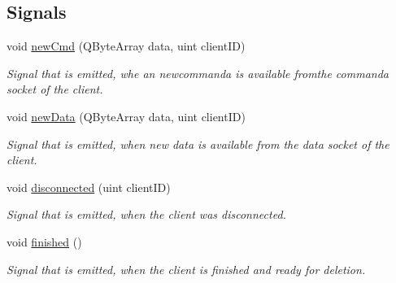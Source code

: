 \subsection*{Signals}
\begin{DoxyCompactItemize}
\item 
void \hyperlink{class_network_1_1_connected_client_a405d291ca221b2390fa58587145b5fb2}{new\+Cmd} (Q\+Byte\+Array data, uint client\+I\+D)
\begin{DoxyCompactList}\small\item\em Signal that is emitted, whe an newcommanda is available fromthe commanda socket of the client. \end{DoxyCompactList}\item 
void \hyperlink{class_network_1_1_connected_client_ad4ed988e03524de43ed3a2ac8df8999c}{new\+Data} (Q\+Byte\+Array data, uint client\+I\+D)
\begin{DoxyCompactList}\small\item\em Signal that is emitted, when new data is available from the data socket of the client. \end{DoxyCompactList}\item 
void \hyperlink{class_network_1_1_connected_client_ae9691e6b687bda4cec080cd26b4fc4a6}{disconnected} (uint client\+I\+D)
\begin{DoxyCompactList}\small\item\em Signal that is emitted, when the client was disconnected. \end{DoxyCompactList}\item 
void \hyperlink{class_network_1_1_connected_client_ad91c79c1c98aaad2b35e554f6030cd0b}{finished} ()
\begin{DoxyCompactList}\small\item\em Signal that is emitted, when the client is finished and ready for deletion. \end{DoxyCompactList}\end{DoxyCompactItemize}
